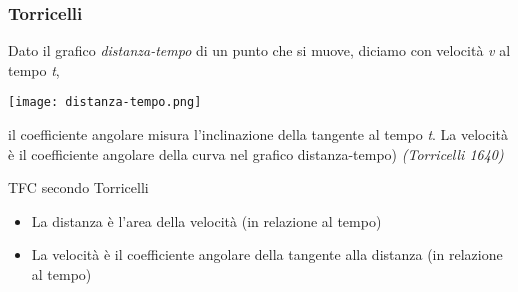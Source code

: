 \begin{frame}[label=Torricelli]
  \frametitle{Torricelli}
    Dato il grafico \textit{distanza-tempo} di un punto che si muove, diciamo
    con velocità \textit{v} al tempo \textit{t}, 
    \begin{center}
        \texttt{[image: distanza-tempo.png]}
    \end{center}
    il \alert{coefficiente angolare} misura l'inclinazione della tangente al tempo \textit{t}.
    La velocità è il coefficiente angolare della curva nel grafico distanza-tempo)
    \textit{(Torricelli 1640)}
  \begin{block}{TFC secondo Torricelli}
    \begin{itemize}
        \item La distanza è l'area della velocità (in relazione al tempo)
        \item La velocità è il coefficiente angolare della tangente alla distanza (in relazione al tempo)
    \end{itemize}
  \end{block}  
\end{frame}